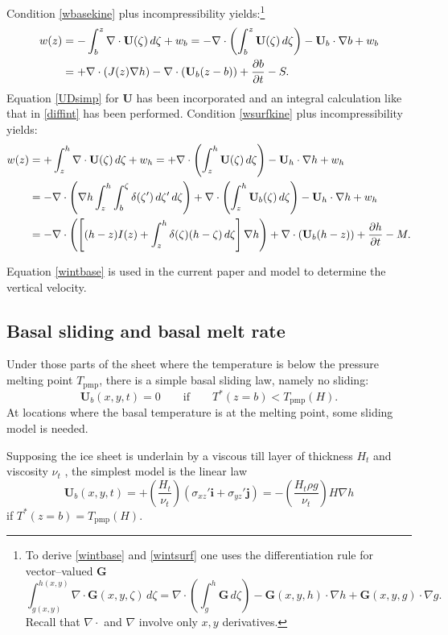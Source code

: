 \documentclass{amsart}%
\theoremstyle{plain}
\theoremstyle{definition}
\theoremstyle{remark}
\newcommand{\ddt}[1]{\ensuremath{\frac{\partial #1}{\partial t}}}
\newcommand{\diverg}{\nabla\cdot}
\newcommand{\grad}{\nabla}
\newcommand{\ihat}{\mathbf{i}}
\newcommand{\jhat}{\mathbf{j}}
\newcommand{\Tpmp}{T_{\text{pmp}}}
\newcommand{\bG}{{\mathbf{G}}}
\newcommand{\bU}{{\mathbf{U}}}
\begin{document}
Condition \eqref{wbasekine} plus incompressibility yields:\footnote{To derive \eqref{wintbase} and \eqref{wintsurf} one uses the differentiation rule for vector--valued $\bG$
    $$\int_{g(x,y)}^{h(x,y)} \diverg \bG(x,y,\zeta)\,d\zeta = \diverg \left(\int_{g}^{h} \bG \,d\zeta\right)- \bG(x,y,h)\cdot \grad h + \bG(x,y,g)\cdot \grad g.$$
Recall that $\diverg$ and $\grad$ involve only $x,y$ derivatives.}
\begin{align}\label{wintbase}
w(z) &= -\int_{b}^z \diverg \bU(\zeta)\,d\zeta + w_b
= - \diverg\left(\int_{b}^z\bU(\zeta)\,d\zeta\right) - \bU_b\cdot\grad b +w_b \notag\\
&=+ \diverg\left(J(z) \grad h\right) - \diverg (\bU_b(z-b)) + \ddt{b} - S.
\end{align}
Equation \eqref{UDsimp} for $\bU$ has been incorporated and an integral calculation like that in \eqref{diffint} has been performed.  Condition \eqref{wsurfkine} plus incompressibility yields:
\begin{align}
w(z) &= +\int_{z}^h \diverg \bU(\zeta)\,d\zeta + w_h = + \diverg\left(\int_{z}^h\bU(\zeta)\,d\zeta\right) - \bU_h\cdot\grad h +w_h\notag\\
&= - \diverg\left(\grad h \int_{z}^h \int_b^\zeta \delta(\zeta')\,d\zeta'\,d\zeta\right) + \diverg\left(\int_{z}^h\bU_b(\zeta)\,d\zeta\right) - \bU_h\cdot\grad h +w_h \notag\\
\label{wintsurf}&= - \diverg\left(\left[(h-z)I(z) + \int_{z}^h\delta(\zeta)(h-\zeta)\,d\zeta\right] \grad h\right) + \diverg\left(\bU_b(h-z)\right) + \ddt{h} - M.\end{align}

Equation \eqref{wintbase} is used in the current paper and model to determine the vertical velocity.


\subsection{Basal sliding and basal melt rate}\label{basalsubsect}  Under those parts of the sheet where the temperature is below the pressure melting point $\Tpmp$, there is a simple basal sliding law, namely no sliding:
    $$\bU_b(x,y,t)=0 \qquad \text{if} \qquad T^*(z=b)< \Tpmp(H).$$
At locations where the basal temperature is at the melting point, some sliding model is needed.

Supposing the ice sheet is underlain by a viscous till layer of thickness $H_t$ and viscosity $\nu_t$ \cite{LingleTroshina,MacAyeal}, the simplest model is the linear law
    $$\bU_b(x,y,t)=+\left(\frac{H_t}{\nu_t}\right) \left(\sigma_{xz}'\ihat+\sigma_{yz}'\jhat\right) = - \left(\frac{H_t \rho g}{\nu_t}\right)  H \grad h$$
if $T^*(z=b)=\Tpmp(H)$.
\end{document}

